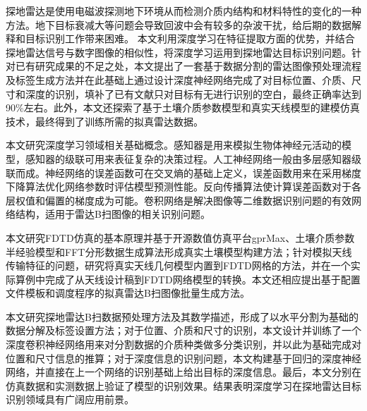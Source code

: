 \begin{chineseabstract}
探地雷达是使用电磁波探测地下环境从而检测介质内结构和材料特性的变化的一种方法。地下目标衰减大等问题会导致回波中会有较多的杂波干扰，给后期的数据解释和目标识别工作带来困难。
本文利用深度学习在特征提取方面的优势，并结合探地雷达信号与数字图像的相似性，将深度学习运用到探地雷达目标识别问题。针对已有研究成果的不足之处，本文提出了一套基于数据分割的雷达图像预处理流程及标签生成方法并在此基础上通过设计深度神经网络完成了对目标位置、介质、尺寸和深度的识别，填补了已有文献只对目标有无进行识别的空白，最终正确率达到90\%左右。此外，本文还探索了基于土壤介质参数模型和真实天线模型的建模仿真技术，最终得到了训练所需的拟真雷达数据。

本文研究深度学习领域相关基础概念。感知器是用来模拟生物体神经元活动的模型，感知器的级联可用来表征复杂的决策过程。人工神经网络一般由多层感知器级联而成。神经网络的误差函数可在交叉熵的基础上定义，误差函数用来在采用梯度下降算法优化网络参数时评估模型预测性能。反向传播算法使计算误差函数对于各层权值和偏置的梯度成为可能。卷积网络是解决图像等二维数据识别问题的有效网络结构，适用于雷达B扫图像的相关识别问题。

本文研究FDTD仿真的基本原理并基于开源数值仿真平台gprMax、土壤介质参数半经验模型和FFT分形数据生成算法形成真实土壤模型构建方法；针对模拟天线传输特征的问题，研究将真实天线几何模型内置到FDTD网格的方法，并在一个实际算例中完成了从天线设计稿到FDTD网络模型的转换。本文还相应提出基于配置文件模板和调度程序的拟真雷达B扫图像批量生成方法。

本文研究探地雷达B扫数据预处理方法及其数学描述，形成了以水平分割为基础的数据分解及标签设置方法；对于位置、介质和尺寸的识别，本文设计并训练了一个深度卷积神经网络用来对分割数据的介质种类做多分类识别，并以此为基础完成对位置和尺寸信息的推算；对于深度信息的识别问题，本文构建基于回归的深度神经网络，并直接在上一个网络的识别基础上给出目标的深度信息。最后，本文分别在仿真数据和实测数据上验证了模型的识别效果。结果表明深度学习在探地雷达目标识别领域具有广阔应用前景。

\end{chineseabstract}

